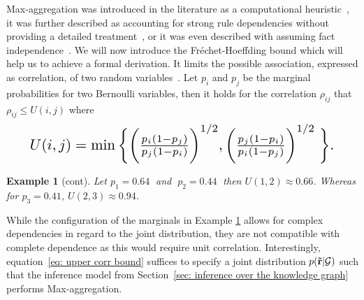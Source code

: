 \documentclass{article}
\theoremstyle{plain}
\newtheorem{example}[theorem]{Example}
\theoremstyle{remark}
\newcommand{\vecallrules}{\mathbf{\Tilde{r}}}
\newcommand{\alltriples}{\mathcal{G}}
\begin{document}
Max-aggregation was introduced in the literature as a computational heuristic~\cite{amieplus2015}, it was further described as accounting for strong rule dependencies without providing a detailed treatment~\cite{meilicke2019anyburl}, or it was even described with assuming fact independence~\cite{svatovs2020strike}. We will now introduce the Fréchet-Hoeffding bound which will help us to achieve a formal derivation. It limits the possible association, expressed as correlation, of two random variables~\cite{joe1997multivariate}.
Let $p_i$ and $p_j$ be the marginal probabilities for two Bernoulli variables, then it holds for the correlation  $\rho_{ij}$ that $\rho_{ij} \leq U(i,j)$ where
\vspace{-0.2cm}
\begin{align}
    \resizebox{0.905\linewidth}{!}{$
     U(i,j) = \min \bigg\{ \bigg( \frac{p_i(1-p_j)}{p_j(1-p_i)}\bigg)^{1/2}, \bigg( \frac{p_j(1-p_i)}{p_i(1-p_j)}\bigg)^{1/2} \; \bigg\}. \label{eq: upper corr bound}
     $}
\end{align}
\begin{example}[cont]
Let $p_1=0.64\;$ and $\;p_2=0.44 \;$ then $U(1,2) \approx 0.66$. Whereas for $p_3=0.41$, $U(2,3) \approx 0.94$.  \label{ex: upper corr bound}
\end{example}
\noindent While the configuration of the marginals in Example \ref{ex: upper corr bound} allows for complex dependencies in regard to the joint distribution, they are not compatible with complete dependence as this would require unit correlation. Interestingly, equation~\eqref{eq: upper corr bound} suffices to specify a joint distribution $p(\vecallrules | \alltriples)$  such that the inference model from Section~\ref{sec: inference over the knowledge graph} performs Max-aggregation.
\end{document}
